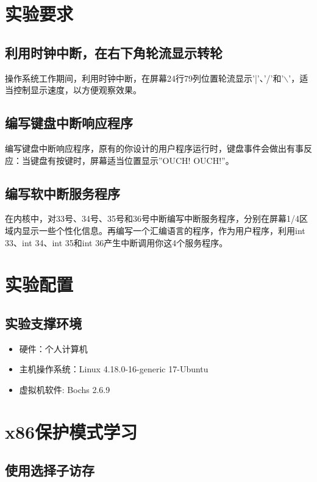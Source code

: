 \documentclass[a4paper,11pt,UTF8]{ctexart}
\begin{document}
\section{实验要求}

	\subsection{利用时钟中断，在右下角轮流显示转轮}

	操作系统工作期间，利用时钟中断，在屏幕24行79列位置轮流显示’|’、’/’和'$\backslash$'，适当控制显示速度，以方便观察效果。

	\subsection{编写键盘中断响应程序}
	编写键盘中断响应程序，原有的你设计的用户程序运行时，键盘事件会做出有事反应：当键盘有按键时，屏幕适当位置显示”OUCH! OUCH!”。
	\subsection{编写软中断服务程序}
	在内核中，对33号、34号、35号和36号中断编写中断服务程序，分别在屏幕1/4区域内显示一些个性化信息。再编写一个汇编语言的程序，作为用户程序，利用int 33、int 34、int 35和int 36产生中断调用你这4个服务程序。

\section{实验配置}

	\subsection{实验支撑环境}
		\begin{itemize} 
			\item 硬件：个人计算机
			\item 主机操作系统：Linux 4.18.0-16-generic 17-Ubuntu
			\item 虚拟机软件: Bochs 2.6.9
		\end{itemize}
	
	
	 
\section{x86保护模式学习}
	\subsection{使用选择子访存}
		
\end{document}
